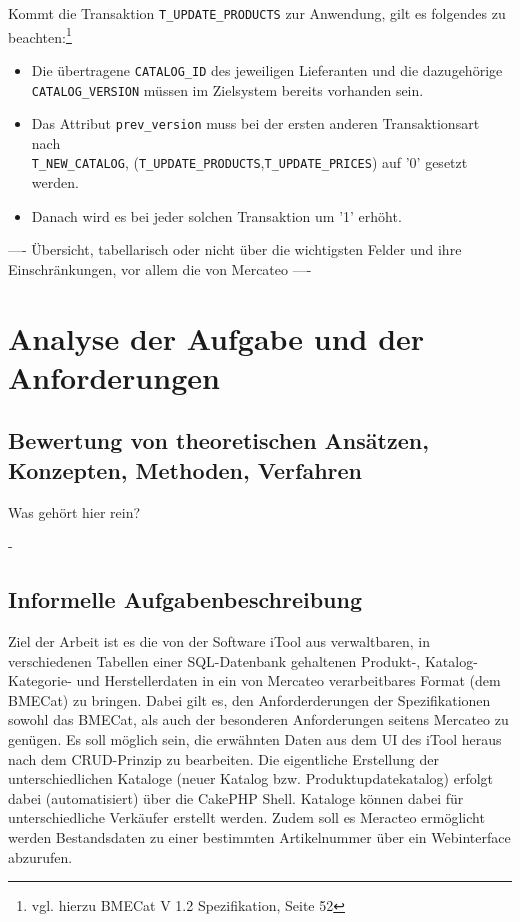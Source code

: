 	Kommt die Transaktion \texttt{T\_UPDATE\_PRODUCTS} zur Anwendung, gilt es folgendes zu beachten:\footnote{vgl. hierzu BMECat V 1.2 Spezifikation, Seite 52} 
	\begin{itemize}
		\item Die übertragene \texttt{CATALOG\_ID} des jeweiligen Lieferanten und die dazugehörige\\ \texttt{CATALOG\_VERSION} müssen im Zielsystem bereits vorhanden sein.
		\item Das Attribut \texttt{prev\_version} muss bei der ersten anderen Transaktionsart nach\\ \texttt{T\_NEW\_CATALOG}, (\texttt{T\_UPDATE\_PRODUCTS},\texttt{T\_UPDATE\_PRICES}) auf '0' gesetzt werden.
		\item Danach wird es bei jeder solchen Transaktion um '1' erhöht.
	\end{itemize}
	
	
	---- Übersicht, tabellarisch oder nicht über die wichtigsten Felder und ihre Einschränkungen, vor allem die von Mercateo ----
	
	
	\section{Analyse der Aufgabe und der Anforderungen}
	
	\subsection{Bewertung von theoretischen Ansätzen, Konzepten, Methoden, Verfahren}
		Was gehört hier rein?
		
			- 
	
	\subsection{Informelle Aufgabenbeschreibung}
	Ziel der Arbeit ist es die von der Software iTool aus verwaltbaren, in verschiedenen Tabellen einer SQL-Datenbank gehaltenen Produkt-, Katalog- Kategorie- und Herstellerdaten in ein von Mercateo verarbeitbares Format (dem BMECat) zu bringen. Dabei gilt es, den Anforderderungen der Spezifikationen sowohl das BMECat, als auch der besonderen Anforderungen seitens Mercateo zu genügen.
	Es soll möglich sein, die erwähnten Daten aus dem UI des iTool heraus nach dem CRUD-Prinzip zu bearbeiten. 
	Die eigentliche Erstellung der unterschiedlichen Kataloge (neuer Katalog bzw. Produktupdatekatalog) erfolgt dabei (automatisiert) über die CakePHP Shell. Kataloge können dabei für unterschiedliche Verkäufer erstellt werden.
	Zudem soll es Meracteo ermöglicht werden Bestandsdaten zu einer bestimmten Artikelnummer über ein Webinterface abzurufen.
	
